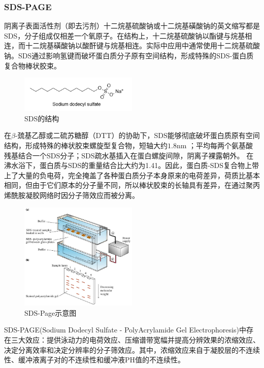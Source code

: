 \subsubsection{SDS-PAGE}
阴离子表面活性剂（即去污剂）十二烷基硫酸钠或十二烷基磺酸钠的英文缩写都是SDS，分子组成仅相差一个氧原子。在结构上，十二烷基硫酸钠以酯键与烷基相连，而十二烷基磺酸钠以酸酐键与烷基相连。实际中应用中通常使用十二烷基硫酸钠。SDS通过影响氢键而破坏蛋白质分子原有空间结构，形成特殊的SDS-蛋白质复合物棒状胶束。

\begin{figure}[H]
    \centering
    \includegraphics[width = 0.5\textwidth]{figure/Some Pictures/SDS.png}
    \caption{SDS的结构}
    \label{fig:enter-label}
\end{figure}

在$\beta$-巯基乙醇或二硫苏糖醇（DTT）的协助下，SDS能够彻底破坏蛋白质原有空间结构，形成特殊的棒状胶束螺旋型复合物，短轴大约$1.8\mathrm{nm}$ ；平均每两个氨基酸残基结合一个SDS分子；SDS疏水基插入在蛋白螺旋间隙，阴离子裸露朝外。
在沸水浴下，蛋白质与SDS的重量结合比大约为1.41。因此，蛋白质-SDS复合物上带上了大量的负电荷，完全掩盖了各种蛋白质分子本身原来的电荷差异，荷质比基本相同，但由于它们原本的分子量不同，所以棒状胶束的长轴具有差异，在通过聚丙烯酰胺凝胶网络时因分子筛效应而被分离。

\begin{figure}[H]
    \centering
    \includegraphics[width = 0.5\textwidth]{figure/Some Pictures/SDS-PAGE简图.png}
    \caption{SDS-Page示意图}
    \label{fig:enter-label}
\end{figure}

SDS-PAGE(Sodium Dodecyl Sulfate - PolyAcrylamide Gel Electrophoresis)中存在三大效应：提供泳动力的电荷效应、压缩谱带宽幅并提高分辨效果的浓缩效应、决定分离效率和决定分辨率的分子筛效应。其中，浓缩效应来自于凝胶层的不连续性、缓冲液离子对的不连续性和缓冲液PH值的不连续性。


